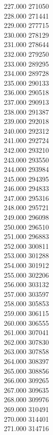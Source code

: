 { 227.000	271050 \\
 228.000	271441 \\
 229.000	277715 \\
 230.000	278129 \\
 231.000	278644 \\
 232.000	279250 \\
 233.000	289295 \\
 234.000	289728 \\
 235.000	290133 \\
 236.000	290518 \\
 237.000	290913 \\
 238.000	291387 \\
 239.000	292018 \\
 240.000	292312 \\
 241.000	292724 \\
 242.000	293210 \\
 243.000	293550 \\
 244.000	293984 \\
 245.000	294395 \\
 246.000	294833 \\
 247.000	295316 \\
 248.000	295721 \\
 249.000	296098 \\
 250.000	296510 \\
 251.000	296883 \\
 252.000	300811 \\
 253.000	301288 \\
 254.000	301912 \\
 255.000	302206 \\
 256.000	303132 \\
 257.000	303597 \\
 258.000	305853 \\
 259.000	306115 \\
 260.000	306555 \\
 261.000	307041 \\
 262.000	307830 \\
 263.000	307858 \\
 264.000	308397 \\
 265.000	308856 \\
 266.000	309265 \\
 267.000	309635 \\
 268.000	309976 \\
 269.000	310491 \\
 270.000	314401 \\
 271.000	314716 \\
}
